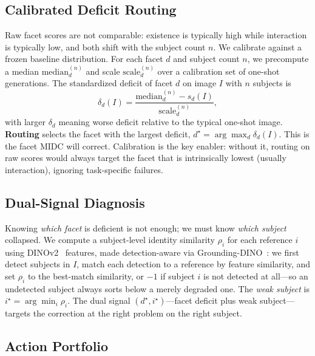 \documentclass[letterpaper]{article}
\begin{document}
\subsection{Calibrated Deficit Routing}
\label{sec:routing}

Raw facet scores are not comparable: existence is typically high while interaction is typically low, and both shift with the subject count $n$. We calibrate against a frozen baseline distribution. For each facet $d$ and subject count $n$, we precompute a median $\mathrm{median}_d^{(n)}$ and scale $\mathrm{scale}_d^{(n)}$ over a calibration set of one-shot generations. The standardized deficit of facet $d$ on image $I$ with $n$ subjects is
\[
\delta_d(I) = \frac{\mathrm{median}_d^{(n)} - s_d(I)}{\mathrm{scale}_d^{(n)}},
\]
with larger $\delta_d$ meaning worse deficit relative to the typical one-shot image. \textbf{Routing} selects the facet with the largest deficit, $d^\star = \arg\max_d \delta_d(I)$.
This is the facet MIDC will correct. Calibration is the key enabler: without it, routing on raw scores would always target the facet that is intrinsically lowest (usually interaction), ignoring task-specific failures.

\subsection{Dual-Signal Diagnosis}
\label{sec:dual}

Knowing \emph{which facet} is deficient is not enough; we must know \emph{which subject} collapsed. We compute a subject-level identity similarity $\rho_i$ for each reference $i$ using DINOv2~\citep{oquab2023dinov2} features, made detection-aware via Grounding-DINO~\citep{liu2023grounding}: we first detect subjects in $I$, match each detection to a reference by feature similarity, and set $\rho_i$ to the best-match similarity, or $-1$ if subject $i$ is not detected at all---so an undetected subject always sorts below a merely degraded one. The \emph{weak subject} is $i^\star = \arg\min_i \rho_i$.
The dual signal $(d^\star, i^\star)$---facet deficit plus weak subject---targets the correction at the right problem on the right subject.

\subsection{Action Portfolio}
\label{sec:portfolio}
\end{document}

